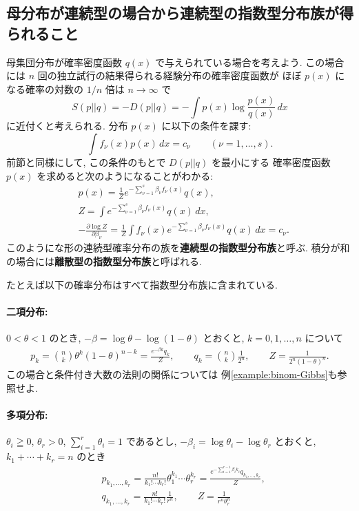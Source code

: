 \documentclass[12pt,twoside]{jarticle}
\renewcommand\d{\partial}
\theoremstyle{jplain}
\theoremstyle{jplain}
\theoremstyle{jplain}
\numberwithin{theorem}{section}
\numberwithin{equation}{section}
\numberwithin{figure}{section}
\numberwithin{table}{section}
\newcommand\exampleref[1]{例\ref{#1}}
\begin{document}

\subsection{母分布が連続型の場合から連続型の指数型分布族が得られること}

母集団分布が確率密度函数 $q(x)$ で与えられている場合を考えよう.
この場合には $n$ 回の独立試行の結果得られる経験分布の確率密度函数が
ほぼ $p(x)$ になる確率の対数の $1/n$ 倍は $n\to\infty$ で
\[
S(p||q)=-D(p||q) = -\int p(x)\log\frac{p(x)}{q(x)}\,dx
\]
に近付くと考えられる. 分布 $p(x)$ に以下の条件を課す:
\[
\int f_\nu(x)p(x)\,dx = c_\nu
\qquad (\nu=1,\ldots,s).
\]
前節と同様にして, この条件のもとで $D(p||q)$ を最小にする
確率密度函数 $p(x)$ を求めると次のようになることがわかる:
\begin{align*}
&
p(x)=\frac{1}{Z}e^{-\sum_{\nu=1}^s \beta_\nu f_\nu(x)}q(x),
\\ &
Z=\int e^{-\sum_{\nu=1}^s \beta_\nu f_\nu(x)}q(x)\,dx,
\\ &
-\frac{\d\log Z}{\d\beta_\nu}
= \frac{1}{Z}\int f_\nu(x) e^{-\sum_{\nu=1}^s \beta_\nu f_\nu(x)}q(x) \,dx
= c_\nu.
\end{align*}
このようにな形の連続型確率分布の族を{\bfseries 連続型の指数型分布族}と呼ぶ.
積分が和の場合には{\bfseries 離散型の指数型分布族}と呼ばれる.

たとえば以下の確率分布はすべて指数型分布族に含まれている.

\paragraph{二項分布:} $0<\theta<1$ のとき,
$-\beta=\log\theta-\log(1-\theta)$ とおくと, $k=0,1,\ldots,n$ について
\begin{align*}
p_k
= \binom{n}{k} \theta^k(1-\theta)^{n-k}
=\frac{e^{-\beta k}q_k}{Z},
\qquad
q_k = \binom{n}{k}\frac{1}{2^n},
\qquad
Z = \frac{1}{2^n(1-\theta)^n}.
\end{align*}
この場合と条件付き大数の法則の関係については
\exampleref{example:binom-Gibbs}も参照せよ.

\paragraph{多項分布:} $\theta_i\geqq 0$, $\theta_r>0$, $\sum_{i=1}^r\theta_i=1$ であるとし,
$-\beta_i=\log\theta_i-\log\theta_r$ とおくと, \\
$k_1+\cdots+k_r=n$ のとき
\begin{align*}
&
p_{k_1,\ldots,k_r}
=
\frac{n!}{k_1!\cdots k_r!}\theta_1^{k_1}\cdots \theta_r^{k_r}
=\frac{e^{-\sum_{i=1}^{r-1}\beta_i k_i}q_{k_1,\ldots,k_r}}{Z},
\\ &
q_{k_1,\ldots,k_r}
=\frac{n!}{k_1!\cdots k_r!}\frac{1}{r^n},
\qquad
Z=\frac{1}{r^n\theta_r^n}
\end{align*}
\end{document}
